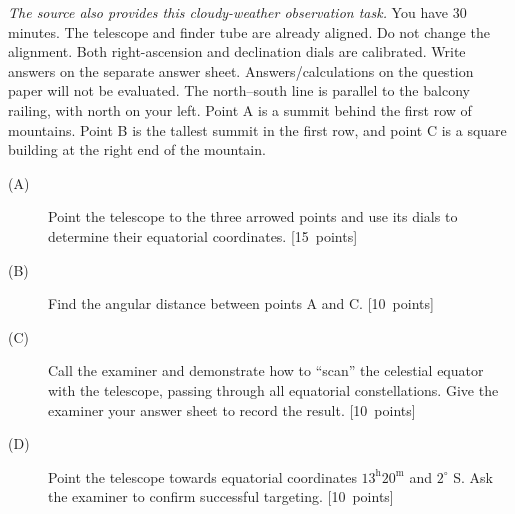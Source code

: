 \textit{The source also provides this cloudy-weather observation task.}
You have 30 minutes. The telescope and finder tube are already aligned. Do not change the alignment.
Both right-ascension and declination dials are calibrated. Write answers on the separate answer sheet.
Answers/calculations on the question paper will not be evaluated.
The north--south line is parallel to the balcony railing, with north on your left.
Point A is a summit behind the first row of mountains. Point B is the tallest summit in the first row,
and point C is a square building at the right end of the mountain.
\begin{description}
\item[(A)] Point the telescope to the three arrowed points and use its dials to determine their equatorial coordinates. \hfill\mbox{[15 points]}
\item[(B)] Find the angular distance between points A and C. \hfill\mbox{[10 points]}
\item[(C)] Call the examiner and demonstrate how to ``scan'' the celestial equator with the telescope,
passing through all equatorial constellations. Give the examiner your answer sheet to record the result. \hfill\mbox{[10 points]}
\item[(D)] Point the telescope towards equatorial coordinates $13^{\mathrm h}20^{\mathrm m}$ and $2^\circ$ S.
Ask the examiner to confirm successful targeting. \hfill\mbox{[10 points]}
\end{description}
